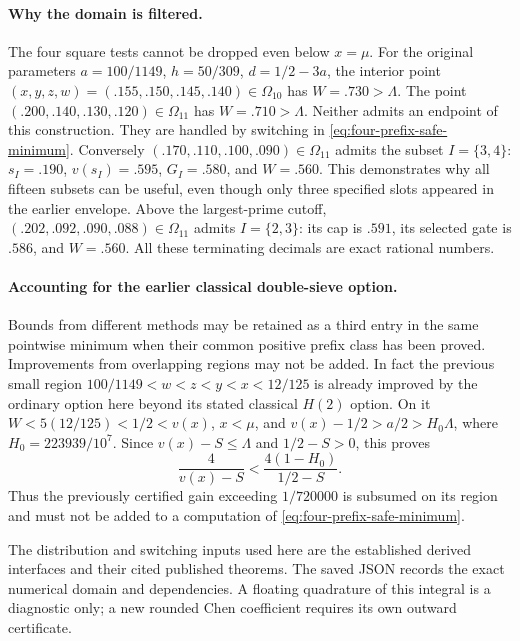 \documentclass[11pt]{article}
\begin{document}
\paragraph{Why the domain is filtered.}
The four square tests cannot be dropped even below $x=\mu$.
For the original parameters $a=100/1149$, $h=50/309$,
$d=1/2-3a$, the interior point
$(x,y,z,w)=(.155,.150,.145,.140)\in\Omega_{10}$ has
$W=.730>\Lambda$.
The point $(.200,.140,.130,.120)\in\Omega_{11}$ has
$W=.710>\Lambda$.  Neither admits an endpoint of this construction.
They are handled by switching in \eqref{eq:four-prefix-safe-minimum}.
Conversely $(.170,.110,.100,.090)\in\Omega_{11}$ admits the
subset $I=\{3,4\}$: $s_I=.190$, $v(s_I)=.595$,
$G_I=.580$, and $W=.560$.  This demonstrates why all fifteen
subsets can be useful, even though only three specified slots
appeared in the earlier envelope.  Above the largest-prime cutoff,
$(.202,.092,.090,.088)\in\Omega_{11}$ admits $I=\{2,3\}$:
its cap is $.591$, its selected gate is $.586$, and $W=.560$.
All these terminating decimals are exact rational numbers.

\paragraph{Accounting for the earlier classical double-sieve option.}
Bounds from different methods may be retained as a third entry in
the same pointwise minimum when their common positive prefix class
has been proved.  Improvements from overlapping regions may not
be added.  In fact the previous small region
$100/1149<w<z<y<x<12/125$ is already improved by the ordinary
option here beyond its stated classical $H(2)$ option.  On it
$W<5(12/125)<1/2<v(x)$, $x<\mu$, and
$v(x)-1/2>a/2>H_0\Lambda$, where $H_0=223939/10^7$.
Since $v(x)-S\le\Lambda$ and $1/2-S>0$, this proves
\[
 \frac4{v(x)-S}
 <\frac{4(1-H_0)}{1/2-S}.
\]
Thus the previously certified gain exceeding $1/720000$ is
subsumed on its region and must not be added to a computation of
\eqref{eq:four-prefix-safe-minimum}.

The distribution and switching inputs used here are the established
derived interfaces and their cited published theorems.  The saved
JSON records the exact numerical domain and dependencies.  A
floating quadrature of this integral is a diagnostic only; a new
rounded Chen coefficient requires its own outward certificate.

\end{document}
